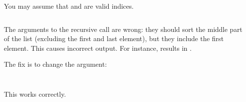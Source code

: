 \begin{prob}
\begin{subprobset}
        \begin{subprob}
            You may assume that  and  are valid indices.
            \inputminted{python}{\thisdir/include/part_c.py}
            \begin{soln}
                The arguments to the recursive call are wrong: they should sort the middle part
                of the list (excluding the first and last element), but they include the first
                element. This causes incorrect output. For instance,  results in
                \python{[3,5,2,4]}.

                The fix is to change the argument:
                \inputminted{python}{\thisdir/include-solution/part_c.py}
            \end{soln}
        \end{subprob}

        \begin{subprob}
            \inputminted{python}{\thisdir/include/part_d.py}
            \begin{soln}
                This works correctly.
            \end{soln}
        \end{subprob}
    \end{subprobset}
\end{prob}
